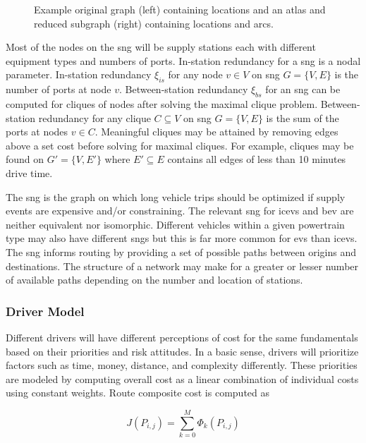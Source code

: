\begin{figure}[H]
\begin{subfigure}[t]{.5\linewidth}
	\end{subfigure}
	\caption{Example original graph (left) containing locations and an atlas and reduced subgraph (right) containing locations and arcs.}
	\label{fig:reduced_subgraph}
\end{figure}

Most of the nodes on the \gls{sng} will be supply stations each with different equipment types and numbers of ports. In-station redundancy for a \gls{sng} is a nodal parameter. In-station redundancy $\xi_{is}$ for any node $v \in V$ on \gls{sng} $G = \{V, E\}$ is the number of ports at node $v$. Between-station redundancy $\xi_{bs}$ for an \gls{sng} can be computed for cliques of nodes after solving the maximal clique problem. Between-station redundancy for any clique $C \subseteq V$ on \gls{sng} $G = \{V, E\}$ is the sum of the ports at nodes $v \in C$. Meaningful cliques may be attained by removing edges above a set cost before solving for maximal cliques. For example, cliques may be found on $G' = \{V, E'\}$ where $E' \subseteq E$ contains all edges of less than 10 minutes drive time.

The \gls{sng} is the graph on which long vehicle trips should be optimized if supply events are expensive and/or constraining. The relevant \gls{sng} for \glspl{icev} and \gls{bev} are neither equivalent nor isomorphic. Different vehicles within a given powertrain type may also have different \glspl{sng} but this is far more common for \glspl{ev} than \glspl{icev}. The \gls{sng} informs routing by providing a set of possible paths between origins and destinations. The structure of a network may make for a greater or lesser number of available paths depending on the number and location of stations.

\subsubsection*{Driver Model}

Different drivers will have different perceptions of cost for the same fundamentals based on their priorities and risk attitudes. In a basic sense, drivers will prioritize factors such as time, money, distance, and complexity differently. These priorities are modeled by computing overall cost as a linear combination of individual costs using constant weights. Route composite cost is computed as

\begin{equation}
	J(P_{i,j}) = \sum_{k = 0}^{M}\Phi_k(P_{i,j})
\end{equation}

